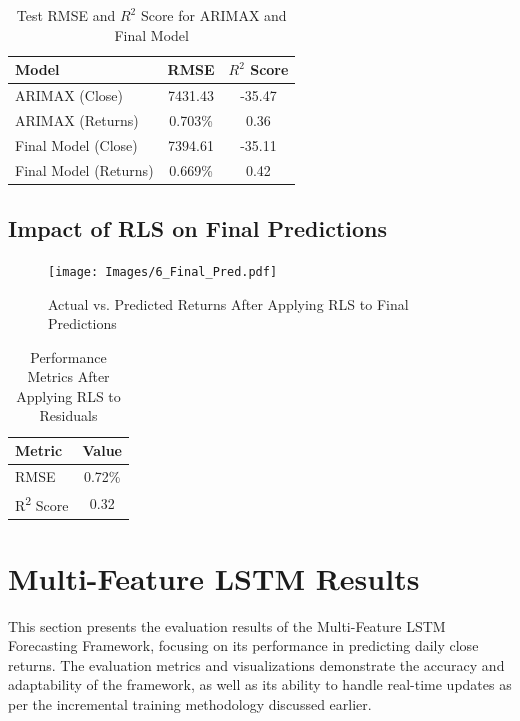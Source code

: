 \begin{table}[h!]
\centering
\caption{Test RMSE and \( R^2 \) Score for ARIMAX and Final Model}
\label{tab:performance_arimax_final}
\begin{tabular}{|l|c|c|}
\hline
\textbf{Model} & \textbf{RMSE} & \textbf{\( R^2 \) Score} \\ \hline
ARIMAX (Close) & 7431.43 & -35.47 \\ \hline
ARIMAX (Returns) & 0.703\% & 0.36 \\ \hline
Final Model (Close) & 7394.61 & -35.11 \\ \hline
Final Model (Returns) & 0.669\% & 0.42 \\ \hline
\end{tabular}
\end{table}

\subsection{Impact of RLS on Final Predictions}

\begin{figure}[h!]
    \centering
    \texttt{[image: Images/6\_Final\_Pred.pdf]}
    \caption{Actual vs. Predicted Returns After Applying RLS to Final Predictions}
    \label{fig:rls_on_residuals}
\end{figure}

\begin{table}[h!]
\centering
\caption{Performance Metrics After Applying RLS to Residuals}
\label{tab:rls_residuals_performance}
\begin{tabular}{|l|c|}
\hline
\textbf{Metric}   & \textbf{Value}  \\ \hline
RMSE              & 0.72\%  \\ \hline
R\textsuperscript{2} Score & 0.32  \\ \hline
\end{tabular}
\end{table}

\section{Multi-Feature LSTM Results}
This section presents the evaluation results of the Multi-Feature LSTM Forecasting Framework, focusing on its performance in predicting daily close returns. The evaluation metrics and visualizations demonstrate the accuracy and adaptability of the framework, as well as its ability to handle real-time updates as per the incremental training methodology discussed earlier.


